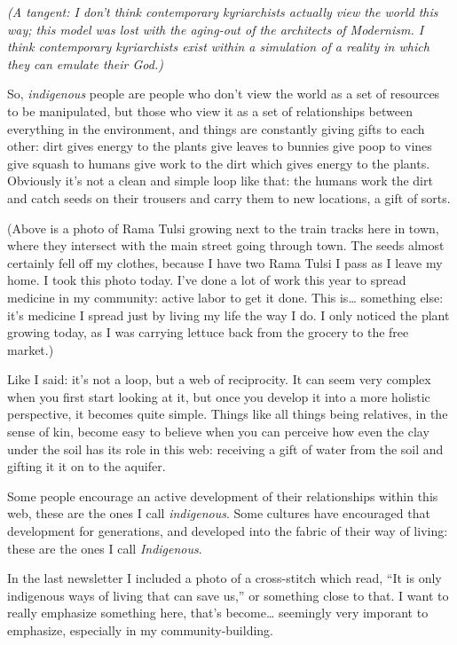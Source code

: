 \documentclass[11pt]{article}
\begin{document}
\begin{itemize}
\emph{(A tangent: I don’t think contemporary kyriarchists actually view the world this way; this model was lost with the aging-out of the architects of Modernism. I think contemporary kyriarchists exist within a simulation of a reality in which they can emulate their God.)}

So, \emph{indigenous} people are people who don’t view the world as a set of resources to be manipulated, but those who view it as a set of relationships between everything in the environment, and things are constantly giving gifts to each other: dirt gives energy to the plants give leaves to bunnies give poop to vines give squash to humans give work to the dirt which gives energy to the plants. Obviously it’s not a clean and simple loop like that: the humans work the dirt and catch seeds on their trousers and carry them to new locations, a gift of sorts.

(Above is a photo of Rama Tulsi growing next to the train tracks here in town, where they intersect with the main street going through town. The seeds almost certainly fell off my clothes, because I have two Rama Tulsi I pass as I leave my home. I took this photo today. I’ve done a lot of work this year to spread medicine in my community: active labor to get it done. This is… something else: it’s medicine I spread just by living my life the way I do. I only noticed the plant growing today, as I was carrying lettuce back from the grocery to the free market.)

Like I said: it’s not a loop, but a web of reciprocity. It can seem very complex when you first start looking at it, but once you develop it into a more holistic perspective, it becomes quite simple. Things like all things being relatives, in the sense of kin, become easy to believe when you can perceive how even the clay under the soil has its role in this web: receiving a gift of water from the soil and gifting it it on to the aquifer.

Some people encourage an active development of their relationships within this web, these are the ones I call \emph{indigenous}. Some cultures have encouraged that development for generations, and developed into the fabric of their way of living: these are the ones I call \emph{Indigenous}.

In the last newsletter I included a photo of a cross-stitch which read, “It is only indigenous ways of living that can save us,” or something close to that. I want to really emphasize something here, that’s become… seemingly very imporant to emphasize, especially in my community-building.


\end{itemize}
\end{document}

